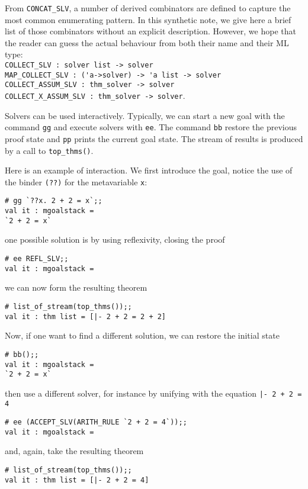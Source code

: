 From \verb|CONCAT_SLV|, a number of derived combinators are defined to
capture the most common enumerating pattern.  In this synthetic note,
we give here a brief list of those combinators without an explicit
description.  However, we hope that the reader can guess the actual
behaviour from both their name and their ML type:\\
\verb|COLLECT_SLV : solver list -> solver|\\
\verb|MAP_COLLECT_SLV : ('a->solver) -> 'a list -> solver|\\
\verb|COLLECT_ASSUM_SLV : thm_solver -> solver|\\
\verb|COLLECT_X_ASSUM_SLV : thm_solver -> solver|.


Solvers can be used interactively.  Typically, we can start a new goal
with the command \verb|gg| and execute solvers with \verb|ee|.  The
command \verb|bb| restore the previous proof state and \verb|pp|
prints the current goal state.  The stream of results is produced by
a call to \verb|top_thms()|.

Here is an example of interaction.  We first introduce the goal,
notice the use of the binder \verb|(??)| for the metavariable \verb|x|:
\begin{verbatim}
# gg `??x. 2 + 2 = x`;;
val it : mgoalstack = 
`2 + 2 = x`
\end{verbatim}
one possible solution is by using reflexivity, closing the proof
\begin{verbatim}
# ee REFL_SLV;;
val it : mgoalstack = 
\end{verbatim}
we can now form the resulting theorem
\begin{verbatim}
# list_of_stream(top_thms());;
val it : thm list = [|- 2 + 2 = 2 + 2]
\end{verbatim}

Now, if one want to find a different solution, we can restore the
initial state
\begin{verbatim}
# bb();;
val it : mgoalstack = 
`2 + 2 = x`
\end{verbatim}
then use a different solver, for instance by unifying with the
equation \verb?|- 2 + 2 = 4?
\begin{verbatim}
# ee (ACCEPT_SLV(ARITH_RULE `2 + 2 = 4`));;
val it : mgoalstack = 
\end{verbatim}
and, again, take the resulting theorem
\begin{verbatim}
# list_of_stream(top_thms());;
val it : thm list = [|- 2 + 2 = 4]
\end{verbatim}

